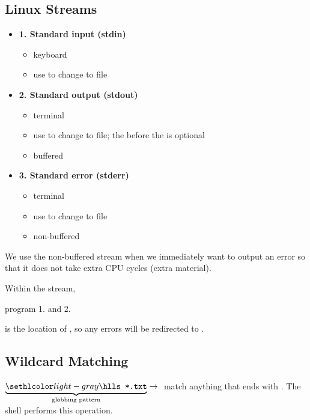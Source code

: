 \subsection{Linux Streams}

\begin{itemize}
      \item \textbf{1. Standard input (stdin)}
            \begin{itemize}
                  \item keyboard
                  \item use \code{<} to change to file
            \end{itemize}
      \item \textbf{2. Standard output (stdout)}
            \begin{itemize}
                  \item terminal
                  \item use  to change to file; the  before the \code{>} is optional
                  \item buffered
            \end{itemize}
      \item \textbf{3. Standard error (stderr)}
            \begin{itemize}
                  \item terminal
                  \item use  to change to file
                  \item non-buffered
            \end{itemize}
\end{itemize}

We use the non-buffered stream when we immediately want to output an error
so that it does not take extra CPU cycles (extra material).

Within the stream,

 \textrightarrow{} program \textrightarrow{}
1.  and 2. 

 \textrightarrow{}
 is the location of , so any errors will be redirected to
.

\subsection{Wildcard Matching}
$ \underbrace{\code{ls *.txt}}_{\text{globbing pattern}} \rightarrow{} $
match anything that ends with . The shell performs this operation.

